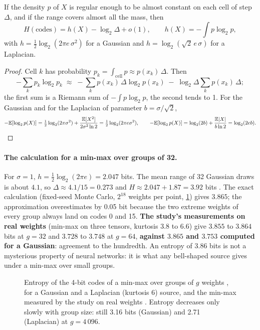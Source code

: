 \begin{proposition}\label{prop:ent-haute-resolution}
If the density $p$ of $X$ is regular enough to be almost constant on each cell of step $\Delta$, and if the range covers almost all the mass, then
\begin{equation}\label{eq:ent-haute-resolution}
H(\text{codes}) = h(X) - \log_2 \Delta + o(1), \qquad h(X) = -\int p \log_2 p,
\end{equation}
with $h = \tfrac12 \log_2(2\pi e\,\sigma^2)$ for a Gaussian and $h = \log_2(\sqrt2\, e\, \sigma)$ for a Laplacian.
\end{proposition}

\begin{proof}
Cell $k$ has probability $p_k = \int_{\text{cell}} p \approx p(x_k)\,\Delta$. Then
\[
-\sum_k p_k \log_2 p_k \;\approx\; -\sum_k p(x_k)\,\Delta \log_2 p(x_k) \;-\; \log_2\Delta \sum_k p(x_k)\,\Delta ;
\]
the first sum is a Riemann sum of $-\int p \log_2 p$, the second tends to 1. For the Gaussian and for the Laplacian of parameter $b = \sigma/\sqrt2$,
\[
-\mathbb{E}[\log_2 p(X)] = \tfrac12\log_2(2\pi\sigma^2) + \frac{\mathbb{E}[X^2]}{2\sigma^2 \ln 2} = \tfrac12\log_2(2\pi e\sigma^2),
\qquad
-\mathbb{E}[\log_2 p(X)] = \log_2(2b) + \frac{\mathbb{E}|X|}{b\ln 2} = \log_2(2 e b).
\]
\end{proof}

\paragraph{The calculation for a min-max over groups of 32.} For $\sigma = 1$, $h = \tfrac12\log_2(2\pi e) = 2.047$ bits. The mean range of 32 Gaussian draws is about $4.1$, so $\Delta \approx 4.1/15 = 0.273$ and $H \approx 2.047 + 1.87 = 3.92$ bits \calc. The exact calculation (fixed-seed Monte Carlo, $2^{18}$ weights per point, \cref{fig:ent-groupes}) gives $3.865$; the approximation overestimates by 0.05 bit because the two extreme weights of every group always land on codes 0 and 15. \textbf{The study's measurements on real weights} (min-max on three tensors, kurtosis 3.8 to 6.6) give $3.855$ to $3.864$ bits at $g = 32$ and $3.728$ to $3.748$ at $g = 64$, \textbf{against $3.865$ and $3.753$ computed for a Gaussian}: agreement to the hundredth. An entropy of 3.86 bits is not a mysterious property of neural networks: it is what any bell-shaped source gives under a min-max over small groups.

\begin{figure}[ht]
\centering
\GrapheEntropieGroupes
\caption[Entropy of the codes of a min-max by group size]{Entropy of the 4-bit codes of a min-max over groups of $g$ weights \calc, for a Gaussian and a Laplacian (kurtosis 6) source, and the min-max measured by the study on real weights \mes. Entropy decreases only slowly with group size: still 3.16 bits (Gaussian) and 2.71 (Laplacian) at $g = 4\,096$.}
\label{fig:ent-groupes}
\end{figure}

